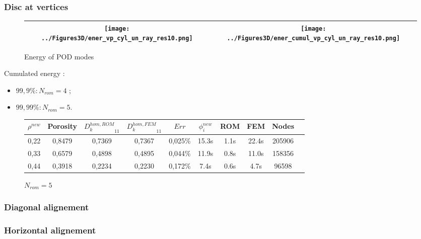 
\subsubsection{Disc at vertices}

\begin{figure}[H]
\begin{center}
\begin{tabular}{|c|c|}
\hline
\texttt{[image: ../Figures3D/ener\_vp\_cyl\_un\_ray\_res10.png]}
&%
\texttt{[image: ../Figures3D/ener\_cumul\_vp\_cyl\_un\_ray\_res10.png]}
\\ \hline
\end{tabular}
\end{center}
\caption{Energy of POD modes}
\end{figure}

\begin{multicols}{2}
Cumulated energy :

\columnbreak
\begin{itemize}
\item $99,9 \% : N_{rom}=4$ ;
\item $99,99 \% : N_{rom}=5$.
\end{itemize}
%
\end{multicols}

\begin{figure}[H]%
%
\begin{center}
\begin{tabular}{|c|c||c|c||c|c||c|c||c||c|}
\hline
$\rho^{new}$&Porosity&${D_k^{hom,ROM}}_{11}$&${D_k^{hom,FEM}}_{11}$&$Err$&$\phi_i^{new}$&ROM&FEM&Nodes\\
\hline
0,22&0,8479&0,7369&0,7367&0,025\%&15.3s&1.1s&22.4s&205906\\
\hline
0,33&0,6579&0,4898&0,4895&0,044\%&11.9s&0.8s&11.0s&158356\\
\hline
0,44&0,3918&0,2234&0,2230&0,172\%&7.4s&0.6s&4.7s&96598\\
\hline
\end{tabular}
\end{center}
\caption{$N_{rom}=5$}
%
\end{figure}

\subsubsection{Diagonal alignement}

\subsubsection{Horizontal alignement}





